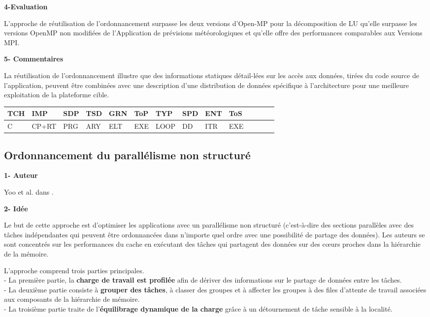 \textbf{4-Evaluation}

L'approche de réutilisation de l'ordonnancement surpasse les deux versions d'Open-MP pour la décomposition de LU  
qu'elle surpasse les versions OpenMP non modifiées de l'Application de prévisions météorologiques et 
qu'elle offre des performances comparables aux Versions MPI.

\textbf{5- Commentaires}

La réutilisation de l'ordonnancement illustre que des informations statiques détail-lées sur les accès aux données, tirées du code source de l'application, peuvent être combinées avec une description d'une distribution de données spécifique à l'architecture pour une meilleure exploitation de la plateforme cible. 
%
\begin{center}%
\begin{tabular}{l *{13}{l}} 		\hline
{TCH} & {IMP} 	& {SDP} 	&  {TSD} 	& {GRN} 	& {ToP} 	& {TYP} 	& {SPD}	& {ENT} 	& {ToS} \\     		\hline
C     	& CP+RT	& PRG		& ARY 	& ELT		& EXE		& LOOP	& DD 	  	& ITR 		& EXE    \\     		          \hline
\end{tabular}
\end{center} 
%
\subsection{Ordonnancement du parallélisme non structuré}\label{ordoPNS}
%
\textbf{1- Auteur}

Yoo et al. dans \cite{Yoo86}.

\textbf{2- Idée}

Le but de cette approche est d'optimiser les applications avec un parallélisme non structuré (c'est-à-dire des sections parallèles avec des tâches indépendantes qui peuvent être ordonnancées dans n'importe quel ordre avec une possibilité de partage des données). 
Les auteurs se sont concentrés sur les performances du cache en exécutant des tâches qui partagent des données sur des cœurs proches dans la hiérarchie de la mémoire. 

L'approche comprend trois parties principales. \\
- La première partie, la \textbf{charge de travail est profilée} afin de dériver des informations sur le partage de données entre les tâches. \\
- La deuxième partie consiste à \textbf{grouper des tâches}, à classer des groupes et à affecter les groupes à des files d'attente de travail associées aux composants de la hiérarchie de mémoire. \\
- La troisième partie traite de l'\textbf{équilibrage dynamique de la charge} grâce à un détournement de tâche sensible à la localité. 

